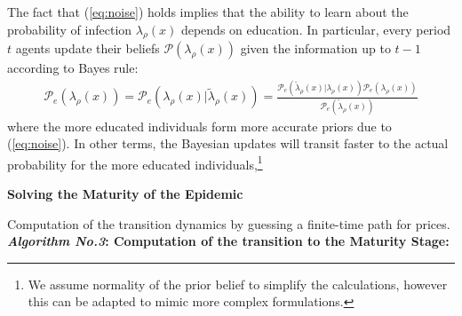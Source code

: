 The fact that (\ref{eq:noise}) holds implies that the ability to learn about the probability of infection $\lambda_\rho(x)$ depends on education. In particular, every period $t$ agents update their beliefs $\mathcal{P}(\lambda_\rho(x))$ given the information up to $t-1$ according to Bayes rule:
\begin{align}
    \mathcal{P}_{e}(\lambda_\rho(x))=\mathcal{P}_{e}(\lambda_\rho(x)|\widetilde{\lambda}_\rho(x))=\frac{\mathcal{P}_{e}(\widetilde{\lambda}_\rho(x)|\lambda_\rho(x))\mathcal{P}_e(\lambda_\rho(x))}{\mathcal{P}_{e}(\widetilde{\lambda}_\rho(x))}
\end{align}
where the more educated individuals form more accurate priors due to  (\ref{eq:noise}). In other terms, the Bayesian updates will transit faster to the actual probability for the more educated individuals,\footnote{\sf We assume normality of the prior belief to simplify the calculations, however this can be adapted to mimic more complex formulations.}


\bigskip
\noindent \textbf{Solving the Maturity of the Epidemic}

Computation of the transition dynamics by guessing a finite-time path for prices.\\

\noindent \textbf{\textit{Algorithm No.3}: Computation of the transition to the Maturity Stage:}\\

